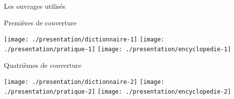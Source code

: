 

\thispagestyle{empty}
\begin{center}
\Large
Les ouvrages utilisés
\normalsize
\end{center}

\vspace{1.3cm}

Premières de couverture

\begin{center}
\texttt{[image: ./presentation/dictionnaire-1]}
\hfill
\texttt{[image: ./presentation/pratique-1]}
\hfill
\texttt{[image: ./presentation/encyclopedie-1]}
\end{center}

\vspace{1.3cm}

Quatrièmes de couverture

\begin{center}
\texttt{[image: ./presentation/dictionnaire-2]}
\hfill
\texttt{[image: ./presentation/pratique-2]}
\hfill
\texttt{[image: ./presentation/encyclopedie-2]}
\end{center}


